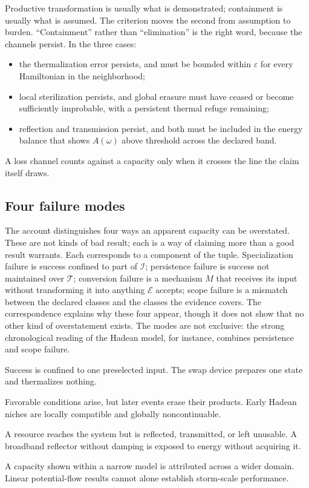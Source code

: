 \documentclass[11pt]{article}
\theoremstyle{definition}
\newcommand{\Iset}{\mathcal I}
\newcommand{\Tset}{\mathcal T}
\newcommand{\Eset}{\mathcal E}
\begin{document}
\noindent Productive transformation is usually what is demonstrated; containment is usually what is assumed. The criterion moves the second from assumption to burden. ``Containment'' rather than ``elimination'' is the right word, because the channels persist. In the three cases:
\begin{itemize}[leftmargin=1.4em]
\item the thermalization error persists, and must be bounded within $\varepsilon$ for every Hamiltonian in the neighborhood;
\item local sterilization persists, and global erasure must have ceased or become sufficiently improbable, with a persistent thermal refuge remaining;
\item reflection and transmission persist, and both must be included in the energy balance that shows $A(\omega)$ above threshold across the declared band.
\end{itemize}
A loss channel counts against a capacity only when it crosses the line the claim itself draws.

\subsection{Four failure modes}

The account distinguishes four ways an apparent capacity can be overstated. These are not kinds of bad result; each is a way of claiming more than a good result warrants. Each corresponds to a component of the tuple. Specialization failure is success confined to part of $\Iset$; persistence failure is success not maintained over $\Tset$; conversion failure is a mechanism $M$ that receives its input without transforming it into anything $\Eset$ accepts; scope failure is a mismatch between the declared classes and the classes the evidence covers. The correspondence explains why these four appear, though it does not show that no other kind of overstatement exists. The modes are not exclusive: the strong chronological reading of the Hadean model, for instance, combines persistence and scope failure.

\begin{description}[leftmargin=1.4em,style=nextline]
\item[Specialization failure] Success is confined to one preselected input. The swap device prepares one state and thermalizes nothing.
\item[Persistence failure] Favorable conditions arise, but later events erase their products. Early Hadean niches are locally compatible and globally noncontinuable.
\item[Conversion failure] A resource reaches the system but is reflected, transmitted, or left unusable. A broadband reflector without damping is exposed to energy without acquiring it.
\item[Scope failure] A capacity shown within a narrow model is attributed across a wider domain. Linear potential-flow results cannot alone establish storm-scale performance.
\end{description}
\end{document}
